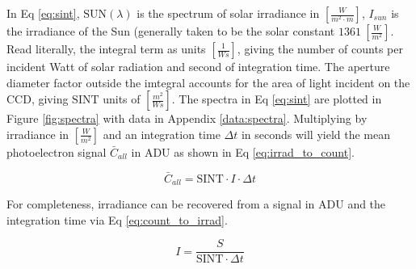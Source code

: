 In Eq \ref{eq:sint}, $\textrm{SUN}(\lambda)$ is the spectrum of solar irradiance in 
$\left[\frac{W}{m^2\cdot m} \right]$, $I_{sun}$ is the irradiance of the Sun (generally taken to be
the solar constant $1361 \: \left[ \frac{W}{m^2} \right]$. Read literally, the integral term as
units $\left[ \frac{1}{Ws} \right]$, giving the number of counts per incident Watt of solar
radiation and second of integration time. The aperture diameter factor outside the imtegral accounts
for the area of light incident on the CCD, giving $\textrm{SINT}$ units of $\left[ \frac{m^2}{Ws}
\right]$. The spectra in Eq \ref{eq:sint} are plotted in Figure \ref{fig:spectra} with data in Appendix \ref{data:spectra}. Multiplying by irradiance in $\left[ \frac{W}{m^2} \right]$ and an integration time $\Delta t$ 
in seconds will yield the mean photoelectron signal $\bar{C}_{all}$ in ADU as shown in Eq \ref{eq:irrad_to_count}.

\begin{equation} \label{eq:irrad_to_count}
  \bar{C}_{all} = \textrm{SINT} \cdot I \cdot \Delta t
\end{equation}

For completeness, irradiance can be recovered from a signal in ADU and the integration time via Eq
\ref{eq:count_to_irrad}.

\begin{equation} \label{eq:count_to_irrad}
  I = \frac{S}{\textrm{SINT} \cdot \Delta t}
\end{equation}
